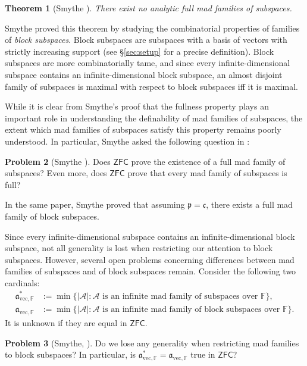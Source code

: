 \documentclass[10pt,a4paper]{amsart}
\theoremstyle{plain}
\numberwithin{equation}{section}
\newtheorem{theorem}{Theorem}[section]
\theoremstyle{definition}
\newtheorem{prob}[theorem]{Problem}
\newcommand{\cal}{\mathcal}
\renewcommand{\frak}{\mathfrak}
\newcommand{\ZFC}{\mathsf{ZFC}}
\newcommand{\A}{\cal{A}}
\newcommand{\avec}{\frak{a}_{\mathrm{vec},\mathbb{F}}}
\let\Sec\S
\renewcommand{\S}{\mathcal{S}}
\begin{document}
\begin{theorem}[Smythe \cite{S19}]
\label{thm:mad.not.analytic}
    There exist no analytic full mad families of subspaces.
\end{theorem}

Smythe proved this theorem by studying the combinatorial properties of families of \emph{block subspaces}. Block subspaces are subspaces with a basis of vectors with strictly increasing support (see \Sec\ref{sec:setup} for a precise definition). Block subspaces are more combinatorially tame, and since every infinite-dimensional subspace contains an infinite-dimensional block subspace, an almost disjoint family of subspaces is maximal with respect to block subspaces iff it is maximal. 

While it is clear from Smythe's proof that the fullness property plays an important role in understanding the definability of mad families of subspaces, the extent which mad families of subspaces satisfy this property remains poorly understood. In particular, Smythe asked the following question in \cite{S19}:

\begin{prob}[Smythe \cite{S19}]
\label{prob:full.mad.families}
    Does $\ZFC$ prove the existence of a full mad family of subspaces? Even more, does $\ZFC$ prove that every mad family of subspaces is full?
\end{prob}

In the same paper, Smythe proved that assuming $\frak{p} = \frak{c}$, there exists a full mad family of block subspaces.

Since every infinite-dimensional subspace contains an infinite-dimensional block subspace, not all generality is lost when restricting our attention to block subspaces. However, several open problems concerning differences between mad families of subspaces and of block subspaces remain. Consider the following two cardinals:
\begin{align*}
    \avec^* &:= \min\{|\A| : \text{$\A$ is an infinite mad family of subspaces over $\mathbb{F}$}\}, \\
    \avec &:= \min\{|\A| : \text{$\A$ is an infinite mad family of block subspaces over $\mathbb{F}$}\}.
\end{align*}
It is unknown if they are equal in $\ZFC$.

\begin{prob}[Smythe, \cite{S19}]
\label{prob:avec*.and.avec}
    Do we lose any generality when restricting mad families to block subspaces? In particular, is $\avec^* = \avec$ true in $\ZFC$?
\end{prob}
\end{document}

